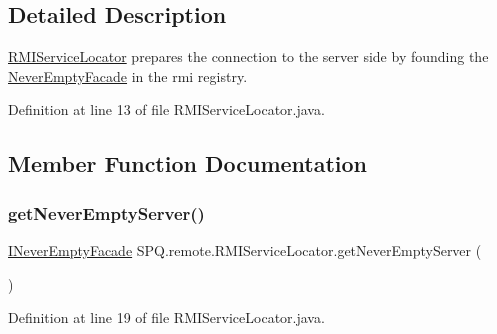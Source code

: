 \subsection{Detailed Description}
\mbox{\hyperlink{class_s_p_q_1_1remote_1_1_r_m_i_service_locator}{R\+M\+I\+Service\+Locator}} prepares the connection to the server side by founding the \mbox{\hyperlink{class_s_p_q_1_1remote_1_1_never_empty_facade}{Never\+Empty\+Facade}} in the rmi registry. 

Definition at line 13 of file R\+M\+I\+Service\+Locator.\+java.



\subsection{Member Function Documentation}
\mbox{\label{class_s_p_q_1_1remote_1_1_r_m_i_service_locator_a19d79d8b31c278a127bf921895d889ae}} 
\subsubsection{\texorpdfstring{get\+Never\+Empty\+Server()}{getNeverEmptyServer()}}
{\footnotesize\ttfamily \mbox{\hyperlink{interface_s_p_q_1_1remote_1_1_i_never_empty_facade}{I\+Never\+Empty\+Facade}} S\+P\+Q.\+remote.\+R\+M\+I\+Service\+Locator.\+get\+Never\+Empty\+Server (\begin{DoxyParamCaption}{ }\end{DoxyParamCaption})}



Definition at line 19 of file R\+M\+I\+Service\+Locator.\+java.

